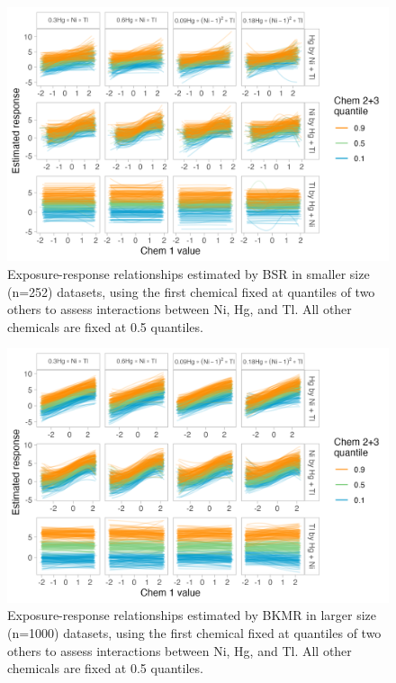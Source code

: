 \documentclass[12pt, twoside]{amherstthesis}
\begin{document}
\begin{figure}

{\centering \includegraphics[width=0.85\linewidth]{figures/ch4_ssm_triv_expresp} 

}

\caption{Exposure-response relationships estimated by BSR in smaller size (n=252) datasets, using the first chemical fixed at quantiles of two others to assess interactions between Ni, Hg, and Tl. All other chemicals are fixed at 0.5 quantiles.}\label{fig:ssmtri}
\end{figure}
\begin{figure}

{\centering \includegraphics[width=0.85\linewidth]{figures/ch4_klg_triv_expresp} 

}

\caption{Exposure-response relationships estimated by BKMR in larger size (n=1000) datasets, using the first chemical fixed at quantiles of two others to assess interactions between Ni, Hg, and Tl. All other chemicals are fixed at 0.5 quantiles.}\label{fig:klgtri}
\end{figure}
\end{document}
